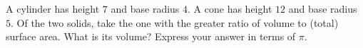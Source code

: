 A cylinder has height $7$ and base radius $4$. A cone has height $12$ and base radius $5$. Of the two solids, take the one with the greater ratio of volume to (total) surface area. What is its volume? Express your answer in terms of $\pi$.
